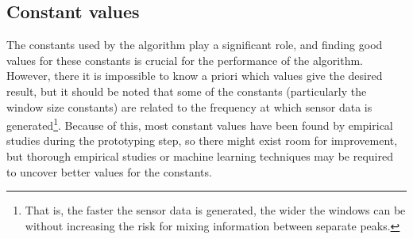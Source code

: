 \subsection{Constant values}
The constants used by the algorithm play a significant role, and finding good values for these constants is crucial for the performance of the algorithm. However, there it is impossible to know a priori which values give the desired result, but it should be noted that some of the constants (particularly the window size constants) are related to the frequency at which sensor data is generated\footnote{That is, the faster the sensor data is generated, the wider the windows can be without increasing the risk for mixing information between separate peaks.}. Because of this, most constant values have been found by empirical studies during the prototyping step, so there might exist room for improvement, but thorough empirical studies or machine learning techniques may be required to uncover better values for the constants.